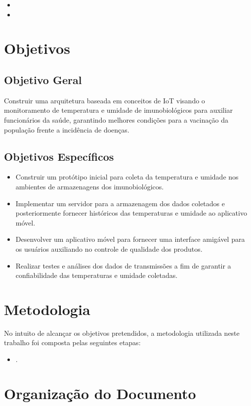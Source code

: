 \begin{itemize}
  \item {}
  \item {}
\end{itemize}

\section{Objetivos}
\label{intro:objetivos}

\subsection{Objetivo Geral}
\label{intro:objetivos:geral}
Construir uma arquitetura baseada em conceitos de IoT visando o monitoramento de temperatura e umidade de imunobiológicos para auxiliar funcionários da saúde, garantindo melhores condições para a vacinação da população frente a incidência de doenças.

\subsection{Objetivos Específicos}
\label{intro:objetivos:especificos}
\begin{itemize}
  \item Construir um protótipo inicial para coleta da temperatura e umidade nos ambientes de armazenagens dos imunobiológicos.
  \item Implementar um servidor para a armazenagem dos dados coletados e posteriormente fornecer históricos das temperaturas e umidade ao aplicativo móvel.
  \item Desenvolver um aplicativo móvel para fornecer uma interface amigável para os usuários auxiliando no controle de qualidade dos produtos.
  \item Realizar testes e análises dos dados de transmissões a fim de garantir a confiabilidade das temperaturas e umidade coletadas.
\end{itemize}

\section{Metodologia}
\label{intro:metodologia}
No intuito de alcançar os objetivos pretendidos, a metodologia utilizada neste trabalho
foi composta pelas seguintes etapas:

\begin{itemize}
  \item {}.
\end{itemize}

\section{Organização do Documento}
\label{intro:organizacao}
